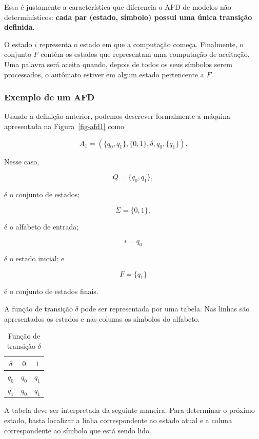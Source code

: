 \documentclass[
  brazilian,
  letterpaper,
]{book}
\theoremstyle{plain}
\theoremstyle{definition}
\theoremstyle{remark}
\begin{document}
Essa é justamente a característica que diferencia o AFD de modelos não
determinísticos: \textbf{cada par (estado, símbolo) possui uma única
transição definida}.

O estado \(i\) representa o estado em que a computação começa.
Finalmente, o conjunto \(F\) contém os estados que representam uma
computação de aceitação. Uma palavra será aceita quando, depois de todos
os seus símbolos serem processados, o autômato estiver em algum estado
pertencente a \(F\).

\subsubsection{Exemplo de um AFD}\label{exemplo-de-um-afd}

Usando a definição anterior, podemos descrever formalmente a máquina
apresentada na Figura~\ref{fig-afd1} como

\[
A_1=
(\{q_0,q_1\},
\{0,1\},
\delta,
q_0,
\{q_1\}).
\]

Nesse caso,

\[
Q=\{q_0,q_1\},
\]

é o conjunto de estados;

\[
\Sigma=\{0,1\},
\]

é o alfabeto de entrada;

\[
i=q_0
\]

é o estado inicial; e

\[
F=\{q_1\}
\]

é o conjunto de estados finais.

A função de transição \(\delta\) pode ser representada por uma tabela.
Nas linhas são apresentados os estados e nas colunas os símbolos do
alfabeto.

\begin{longtable}[]{|c|c|c|}

\caption{\label{tbl-transicao}Função de transição \(\delta\)}

\tabularnewline

\toprule\noalign{}
\(\delta\) & \(0\) & \(1\) \\
\midrule\noalign{}
\endhead
\bottomrule\noalign{}
\endlastfoot
\(q_0\) & \(q_0\) & \(q_1\) \\
\midrule
\(q_1\) & \(q_0\) & \(q_1\) \\

\end{longtable}

A tabela deve ser interpretada da seguinte maneira. Para determinar o
próximo estado, basta localizar a linha correspondente ao estado atual e
a coluna correspondente ao símbolo que está sendo lido.
\end{document}
